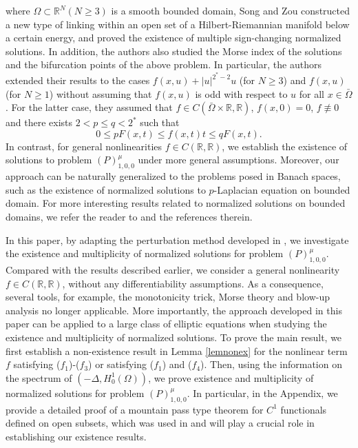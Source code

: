 \documentclass[11pt]{amsart}
\newcommand{\abs}[1]{\lvert#1\rvert}
\newcommand{\R}{\mathbb{R}}
\numberwithin{equation}{section}
\begin{document}
where $\Omega \subset \R^N(N \geq 3)$ is a smooth bounded domain, Song and Zou constructed a new type of linking within an open set of a Hilbert-Riemannian manifold below a certain energy, and proved the existence of multiple sign-changing normalized solutions. In addition, the authors also studied the Morse index of the solutions and the bifurcation points of the above problem. In particular, the authors extended their results to the cases $f(x,u)+ \abs{u}^{2^*-2}u$ (for $N\geq 3$) and $f(x,u)$ (for $N\geq 1$) without assuming that $f(x,u)$ is odd with respect to $u$ for all $x \in \bar{\Omega}$. For the latter case, they assumed that $f \in C(\bar{\Omega}\times \R,\R)$, $f(x,0)=0$, $f\not \equiv 0$ and there exists $2<p\leq q<2^*$ such that
$$
 0\leq pF(x,t)\leq f(x,t)t \leq qF(x,t).
$$
In contrast, for general nonlinearities $f\in C(\R,\R)$, we establish the existence of solutions to problem $(P)^{\mu}_{1,0,0}$ under  more general assumptions. Moreover, our approach can be naturally generalized to the problems posed in Banach spaces, such as the existence of normalized solutions to $p$-Laplacian equation on bounded domain. For more interesting  results related to normalized solutions on bounded domains, we refer the reader to \cite{AS2, BQZ, Chang, BenedettaTavaresVerzini, BenedettaTavaresVerzini2, Darion, Song} and the references therein.




In this paper, by adapting the perturbation method developed in \cite{Bu,Es}, we investigate the existence and multiplicity of normalized solutions for  problem $(P)^{\mu}_{1,0,0}$. Compared with the results described earlier,  we consider a general nonlinearity $f \in C(\R,\R)$, without any differentiability assumptions. As a consequence, several tools, for example,  the monotonicity trick, Morse theory and blow-up analysis no longer applicable. %
More importantly, the approach developed in this paper can be applied to a large class of elliptic equations when studying the existence and multiplicity of normalized solutions. To prove the main result, we first establish a non-existence result in Lemma \ref{lemnonex} for the nonlinear term $f$ satisfying ($f_1$)-($f_3$) or satisfying ($f_1$) and ($f_4$). Then,  using the information on the spectrum of $(-\Delta,H_0^1(\Omega))$, we prove existence and multiplicity of normalized solutions for problem $(P)^{\mu}_{1,0,0}$. In particular, in the Appendix,  we provide  a detailed proof of a mountain pass type theorem for $C^1$ functionals defined on open subsets, which was used in \cite{Bu} and will play a crucial role in establishing our existence results.
\end{document}
